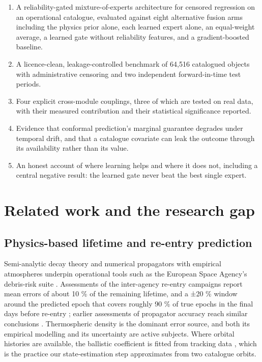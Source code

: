 \documentclass[3p,times]{elsarticle}
\providecommand{\tightlist}{\setlength{\itemsep}{0pt}\setlength{\parskip}{0pt}}
\providecommand{\tightlist}{\setlength{\itemsep}{0pt}\setlength{\parskip}{0pt}}
\begin{document}
\begin{enumerate}
\def\labelenumi{\arabic{enumi}.}
\tightlist
\item
  A reliability-gated mixture-of-experts architecture for censored
  regression on an operational catalogue, evaluated against eight
  alternative fusion arms including the physics prior alone, each
  learned expert alone, an equal-weight average, a learned gate without
  reliability features, and a gradient-boosted baseline.
\item
  A licence-clean, leakage-controlled benchmark of 64,516 catalogued
  objects with administrative censoring and two independent
  forward-in-time test periods.
\item
  Four explicit cross-module couplings, three of which are tested on
  real data, with their measured contribution and their statistical
  significance reported.
\item
  Evidence that conformal prediction's marginal guarantee degrades under
  temporal drift, and that a catalogue covariate can leak the outcome
  through its availability rather than its value.
\item
  An honest account of where learning helps and where it does not,
  including a central negative result: the learned gate never beat the
  best single expert.
\end{enumerate}

\section{Related work and the research gap}\label{sec:related}

\subsection{Physics-based lifetime and re-entry
prediction}\label{physics-based-lifetime-and-re-entry-prediction}

Semi-analytic decay theory
\citep{kinghele1987satellite, frey2019extension} and numerical
propagators with empirical atmospheres underpin operational tools such
as the European Space Agency's debris-risk suite \citep{braun2020drama}.
Assessments of the inter-agency re-entry campaigns report mean errors of
about 10 \% of the remaining lifetime, and a ±20 \% window around the
predicted epoch that covers roughly 90 \% of true epochs in the final
days before re-entry \citep{pardini2018assessing}; earlier assessments
of propagator accuracy reach similar conclusions
\citep{pardini2004accuracy, operti2017assessing}. Thermospheric density
is the dominant error source, and both its empirical modelling
\citep{emmert2021nrlmsis, licata2022msis} and its uncertainty
\citep{licata2022uncertainty, pardini2012thermospheric} are active
subjects. Where orbital histories are available, the ballistic
coefficient is fitted from tracking data
\citep{gondelach2017ballistic, sang2013estimation, pardini2008impact},
which is the practice our state-estimation step approximates from two
catalogue orbits.
\end{document}
